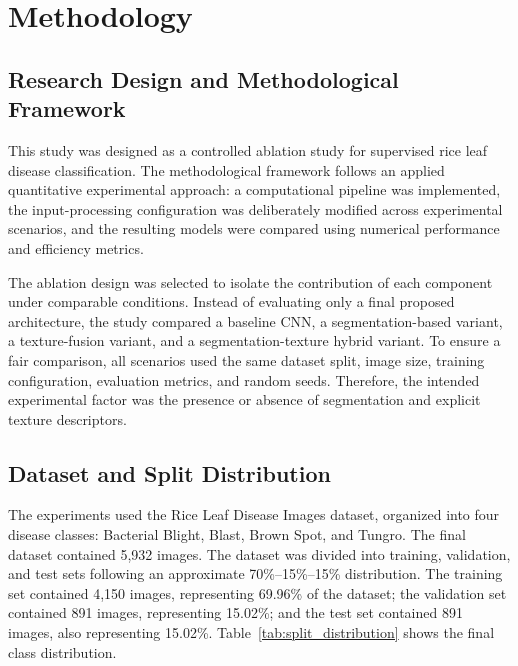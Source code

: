 \section{Methodology}

\subsection{Research Design and Methodological Framework}

This study was designed as a controlled ablation study for supervised rice leaf disease classification. The methodological framework follows an applied quantitative experimental approach: a computational pipeline was implemented, the input-processing configuration was deliberately modified across experimental scenarios, and the resulting models were compared using numerical performance and efficiency metrics.

The ablation design was selected to isolate the contribution of each component under comparable conditions. Instead of evaluating only a final proposed architecture, the study compared a baseline CNN, a segmentation-based variant, a texture-fusion variant, and a segmentation-texture hybrid variant. To ensure a fair comparison, all scenarios used the same dataset split, image size, training configuration, evaluation metrics, and random seeds. Therefore, the intended experimental factor was the presence or absence of segmentation and explicit texture descriptors.

\subsection{Dataset and Split Distribution}

The experiments used the Rice Leaf Disease Images dataset, organized into four disease classes: Bacterial Blight, Blast, Brown Spot, and Tungro. The final dataset contained 5,932 images. The dataset was divided into training, validation, and test sets following an approximate 70\%--15\%--15\% distribution. The training set contained 4,150 images, representing 69.96\% of the dataset; the validation set contained 891 images, representing 15.02\%; and the test set contained 891 images, also representing 15.02\%. Table~\ref{tab:split_distribution} shows the final class distribution.

